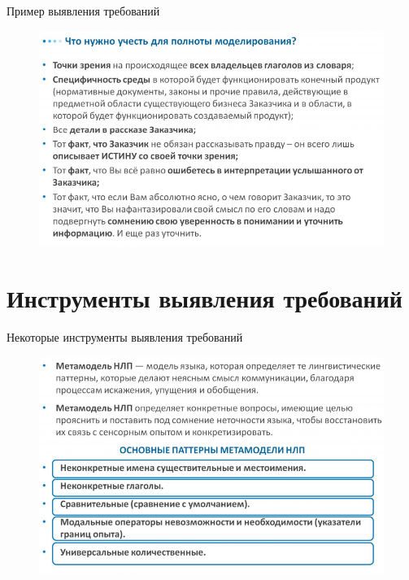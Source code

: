 \documentclass{beamer}
\begin{document}
\begin{frame}[t]{Пример выявления требований}
\begin{figure}[h]
\centering
\includegraphics[scale=0.5]{images/lec02-pic14.png}
\end{figure}
\end{frame}

\section{Инструменты выявления требований}

\begin{frame}[t]{Некоторые инструменты выявления требований}
\begin{figure}[h]
\centering
\includegraphics[scale=0.5]{images/lec02-pic15.png}
\end{figure}
\end{frame}
\end{document}
